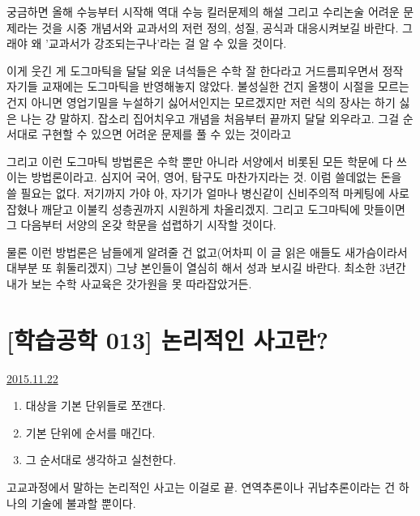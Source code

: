 궁금하면 올해 수능부터 시작해 역대 수능 킬러문제의 해설
그리고 수리논술 어려운 문제라는 것을 시중 개념서와 교과서의 저런 정의, 성질, 공식과 대응시켜보길 바란다.
그래야 왜 '교과서가 강조되는구나'라는 걸 알 수 있을 것이다.
\vspace{5mm}

이게 웃긴 게 도그마틱을 달달 외운 녀석들은 수학 잘 한다라고 거드름피우면서 정작 자기들 교재에는 도그마틱을 반영해놓지 않았다.
불성실한 건지 올챙이 시절을 모르는 건지 아니면 영업기밀을 누설하기 싫어서인지는 모르겠지만
저런 식의 장사는 하기 싫은 나는 걍 말하지. 잡소리 집어치우고 개념을 처음부터 끝까지 달달 외우라고.
그걸 순서대로 구현할 수 있으면 어려운 문제를 풀 수 있는 것이라고
\vspace{5mm}

그리고 이런 도그마틱 방법론은 수학 뿐만 아니라 서양에서 비롯된 모든 학문에 다 쓰이는 방법론이라고.
심지어 국어, 영어, 탐구도 마찬가지라는 것.
이럼 쓸데없는 돈을 쓸 필요는 없다.
저기까지 가야 아, 자기가 얼마나 병신같이 신비주의적 마케팅에 사로잡혔나 깨닫고 이불킥 성층권까지 시원하게 차올리겠지.
그리고 도그마틱에 맛들이면 그 다음부터 서양의 온갖 학문을 섭렵하기 시작할 것이다.
\vspace{5mm}

물론 이런 방법론은 남들에게 알려줄 건 없고(어차피 이 글 읽은 애들도 새가슴이라서 대부분 또 휘둘리겠지)
그냥 본인들이 열심히 해서 성과 보시길 바란다.
최소한 3년간 내가 보는 수학 사교육은 갓가원을 못 따라잡았거든.
\vspace{5mm}




\section{[학습공학 013] 논리적인 사고란?}
\href{https://www.kockoc.com/Apoc/504605}{2015.11.22}

\vspace{5mm}
\begin{enumerate}
    \item 대상을 기본 단위들로 쪼갠다.
    \item 기본 단위에 순서를 매긴다.
    \item 그 순서대로 생각하고 실천한다.
\end{enumerate}
\vspace{5mm}

고교과정에서 말하는 논리적인 사고는 이걸로 끝.
연역추론이나 귀납추론이라는 건 하나의 기술에 불과할 뿐이다.
\vspace{5mm}

